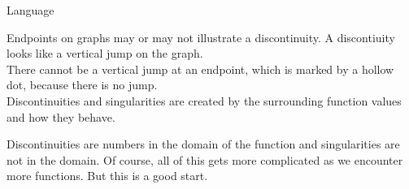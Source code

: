\documentclass{ximera}
\begin{document}
\begin{idea} Language 


Endpoints on graphs may or may not illustrate a discontinuity. A discontiuity looks like a vertical jump on the graph. \\


There cannot be a vertical jump at an endpoint, which is marked by a hollow dot, because there is no jump. \\


Discontinuities and singularities are created by the surrounding function values and how they behave.

\end{idea}



Discontinuities are numbers in the domain of the function and singularities are not in the domain. Of course, all of this gets more complicated as we encounter more functions.  But this is a good start. \\
\end{document}
